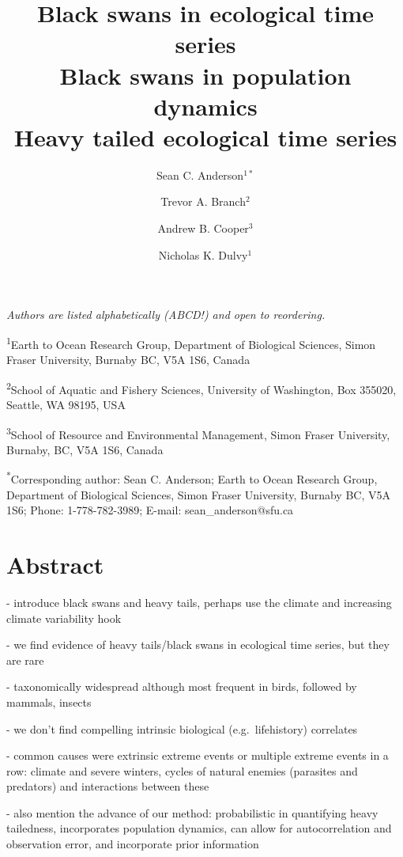 \documentclass[11pt]{article}
\title{Black swans in ecological time series\\Black swans in population dynamics\\Heavy tailed ecological time series}
\author{
Sean C. Anderson$^{1\ast}$ \and
Trevor A. Branch$^2$ \and
Andrew B. Cooper$^3$ \and
Nicholas K. Dulvy$^1$
}
\date{}
\begin{document}

\onehalfspacing

\maketitle
\thispagestyle{empty}

\noindent
\textit{Authors are listed alphabetically (ABCD!) and open to reordering.}

\noindent
\textsuperscript{1}Earth to Ocean Research Group, Department of Biological Sciences, Simon Fraser University, Burnaby BC, V5A 1S6, Canada

\noindent
\textsuperscript{2}School of Aquatic and Fishery Sciences, University of Washington, Box 355020, Seattle, WA 98195, USA

\noindent
\textsuperscript{3}School of Resource and Environmental Management, Simon Fraser University, Burnaby, BC, V5A 1S6, Canada

\noindent
\textsuperscript{*}Corresponding author: Sean C. Anderson; Earth to Ocean Research Group, Department of Biological Sciences, Simon Fraser University, Burnaby BC, V5A 1S6; Phone: 1-778-782-3989; E-mail: sean\_anderson@sfu.ca

\clearpage

\setcounter{page}{1}

\section{Abstract}
- introduce black swans and heavy tails, perhaps use the climate and increasing climate variability hook

- we find evidence of heavy tails/black swans in ecological time series, but they are rare

- taxonomically widespread although most frequent in birds, followed by mammals, insects

- we don't find compelling intrinsic biological (e.g.\ lifehistory) correlates

- common causes were extrinsic extreme events or multiple extreme events in a row: climate and severe winters, cycles of natural enemies (parasites and predators) and interactions between these

- also mention the advance of our method: probabilistic in quantifying heavy tailedness, incorporates population dynamics, can allow for autocorrelation and observation error, and incorporate prior information
\end{document}
